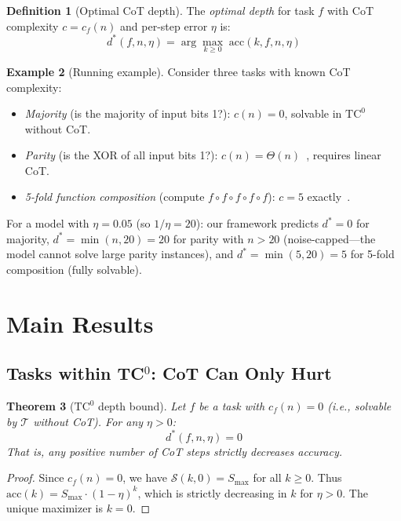 \documentclass{article}
\newtheorem{theorem}{Theorem}
\theoremstyle{definition}
\newtheorem{definition}[theorem]{Definition}
\newtheorem{example}[theorem]{Example}
\theoremstyle{remark}
\providecommand{\TC}{\mathrm{TC}^0}
\newcommand{\depth}{d^*}       %
\newcommand{\noise}{\eta}      %
\newcommand{\acc}{\mathrm{acc}} %
\newcommand{\suf}{\mathcal{S}} %
\newcommand{\ccot}{c}          %
\newcommand{\Smax}{S_{\max}}   %
\begin{document}
\begin{definition}[Optimal CoT depth]
\label{def:optimal-depth}
The \emph{optimal depth} for task $f$ with CoT complexity $c = \ccot_f(n)$ and per-step error $\noise$ is:
\[
\depth(f, n, \noise) = \arg\max_{k \geq 0} \; \acc(k, f, n, \noise)
\]
\end{definition}

\begin{example}[Running example]
\label{ex:running}
Consider three tasks with known CoT complexity:
\begin{itemize}
\item \emph{Majority} (is the majority of input bits 1?): $\ccot(n) = 0$, solvable in $\TC$ without CoT.
\item \emph{Parity} (is the XOR of all input bits 1?): $\ccot(n) = \Theta(n)$~\cite{amiri2025lower}, requires linear CoT.
\item \emph{5-fold function composition} (compute $f \circ f \circ f \circ f \circ f$): $\ccot = 5$ exactly~\cite{barcelo2025ehrenfeucht}.
\end{itemize}
For a model with $\noise = 0.05$ (so $1/\noise = 20$): our framework predicts $\depth = 0$ for majority, $\depth = \min(n, 20) = 20$ for parity with $n > 20$ (noise-capped---the model cannot solve large parity instances), and $\depth = \min(5, 20) = 5$ for 5-fold composition (fully solvable).
\end{example}

\section{Main Results}
\label{sec:results}

\subsection{Tasks within TC\texorpdfstring{$^0$}{0}: CoT Can Only Hurt}
\label{sec:tc0-bound}

\begin{theorem}[$\TC$ depth bound]
\label{thm:tc0-bound}
Let $f$ be a task with $\ccot_f(n) = 0$ (i.e., solvable by $\mathcal{T}$ without CoT). For any $\noise > 0$:
\[
\depth(f, n, \noise) = 0
\]
That is, any positive number of CoT steps strictly decreases accuracy.
\end{theorem}

\begin{proof}
Since $\ccot_f(n) = 0$, we have $\suf(k, 0) = \Smax$ for all $k \geq 0$. Thus $\acc(k) = \Smax \cdot (1-\noise)^k$, which is strictly decreasing in $k$ for $\noise > 0$. The unique maximizer is $k = 0$.
\end{proof}
\end{document}
